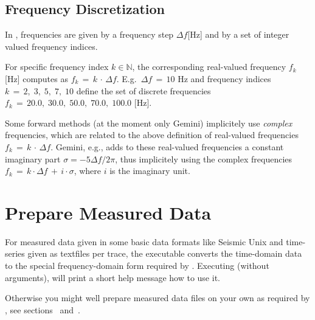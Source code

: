 \subsection*{Frequency Discretization}
%
In \ASKI{}, frequencies are given by a frequency step $\Delta f$[Hz] and by a set of integer valued 
frequency indices.

For specific frequency index $k\in\mathbb{N}$, the corresponding real-valued frequency $f_k$ [Hz] computes as
$f_k \,=\, k \,\cdot\, \Delta f$.
E.g.\ $\Delta f \,=\, 10$ Hz and frequency indices $k \,=\, 2,\; 3,\; 5,\; 7,\; 10$ define the set of 
discrete frequencies $f_k \,=\, 20.0,\; 30.0,\; 50.0,\; 70.0,\; 100.0$ [Hz].

Some forward methods (at the moment only Gemini) implicitely use \emph{complex} frequencies, which are related
to the above definition of real-valued frequencies $f_k \,=\, k \,\cdot\, \Delta f$.
Gemini, e.g., adds to these real-valued frequencies a constant imaginary part $\sigma = -5\Delta f/2\pi$,
thus implicitely using the complex frequencies $f_k \,=\, k \cdot \Delta f \,+\,i\cdot \sigma$,
where $i$ is the imaginary unit.
%
\section{Prepare Measured Data} \label{basic_steps,sec:measured_data}
%
For measured data given in some basic data formats like Seismic Unix and time-series given as textfiles per trace,
the executable   
converts the time-domain data to the special frequency-domain
form required by \ASKI{}. Executing  (without arguments), will print a short help message how to use it.

Otherwise you might well prepare measured data files on your own as required by \ASKI{}, see sections~ 
and~. 
%
